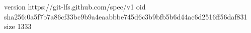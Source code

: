 version https://git-lfs.github.com/spec/v1
oid sha256:0a5f7b7a86cf33bc9b9a4eaabbbe745d6c3b9bfb5b6d44ac6d2516ff56daf831
size 1333
